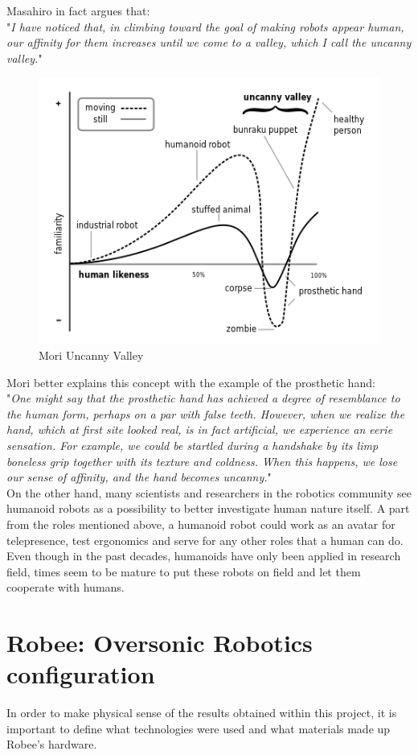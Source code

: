 Masahiro in fact argues that:\\
"\textit{I have noticed that, in climbing toward the goal of making robots appear human, our affinity for them increases until we come to a valley, which I call the uncanny valley.}"
\begin{figure}[H]
    \centering
    \includegraphics[scale=0.8]{Images/Chapter 3/Mori_Uncanny_Valley.png}
    \caption{Mori Uncanny Valley}
    \label{fig:mori_uncanny_valley}
\end{figure}
Mori better explains this concept with the example of the prosthetic hand:
\\
"\textit{One might say that the prosthetic hand has achieved a degree of resemblance to the human form, perhaps on a par with false teeth. However, when we realize the hand, which at first site looked real, is in fact artificial, we experience an eerie sensation. For example, we could be startled during a handshake by its limp boneless grip together with its texture and coldness. When this happens, we lose our sense of affinity, and the hand becomes uncanny.}"
\\
On the other hand, many scientists and researchers in the robotics community see humanoid robots as a possibility to better investigate human nature itself.
A part from the roles mentioned above, a humanoid robot could work as an avatar for telepresence, test ergonomics and serve for any other  roles that a human can do.
Even though in the past decades, humanoids have only been applied in research field, times seem to be mature to put these robots on field and let them cooperate with humans.
\section{Robee: Oversonic Robotics configuration}
In order to make physical sense of the results obtained within this project, it is important to define what technologies were used and what materials made up Robee's hardware.
